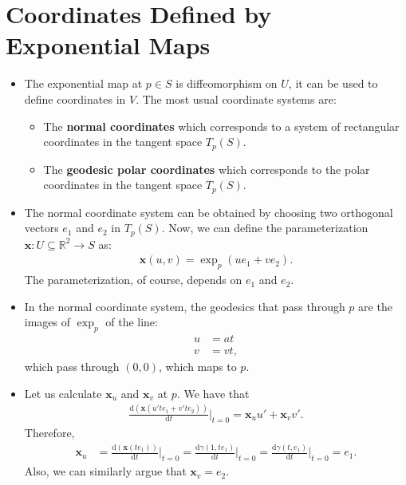 \documentclass[10pt]{article}
\newcommand{\dee}{\mathrm{d}}
\newcommand{\ve}[1]{\mathbf{#1}}
\newcommand{\ra}{\rightarrow}
\newcommand{\Real}{\mathbb{R}}
\newcommand{\sseq}{\subseteq}
\begin{document}
  \section{Coordinates Defined by Exponential Maps}
  \begin{itemize}
    \item The exponential map at $p \in S$ is diffeomorphism on $U$, it can be used to define coordinates in $V$. The most usual coordinate systems are:
    \begin{itemize}
      \item The {\bf normal coordinates} which corresponds to a system of rectangular coordinates in the tangent space $T_p(S)$.

      \item The {\bf geodesic polar coordinates} which corresponds to the polar coordinates in the tangent space $T_p(S)$.      
    \end{itemize}

    \item The normal coordinate system can be obtained by choosing two orthogonal vectors $e_1$ and $e_2$ in $T_p(S)$.
    Now, we can define the parameterization $\ve{x}: U \sseq \Real^2 \ra S$ as:
    \begin{align*}
      \ve{x}(u,v) = \exp_p(ue_1 + ve_2).
    \end{align*}
    The parameterization, of course, depends on $e_1$ and $e_2$.

    \item In the normal coordinate system, the geodesics that pass through $p$ are the images of $\exp_p$ of the line:
    \begin{align*}
      u &= at\\
      v &= vt,
    \end{align*}
    which pass through $(0,0)$, which maps to $p$.

    \item Let us calculate $\ve{x}_u$ and $\ve{x}_v$ at $p$. We have that
    \begin{align*}
      \frac{\dee(\ve{x}(u't e_1 + v' t e_2))}{\dee t}\bigg|_{t=0} = \ve{x}_u u' + \ve{x}_v v'.
    \end{align*}
    Therefore,
    \begin{align*}
      \ve{x}_u &= \frac{\dee(\ve{x}(te_1))}{\dee t}\bigg|_{t=0}
      = \frac{\dee\gamma(1,te_1)}{\dee t}\bigg|_{t=0} 
      = \frac{\dee\gamma(t,e_1)}{\dee t}\bigg|_{t=0} 
      = e_1.
    \end{align*}
    Also, we can similarly argue that $\ve{x}_v = e_2$.


\end{itemize}
\end{document}
